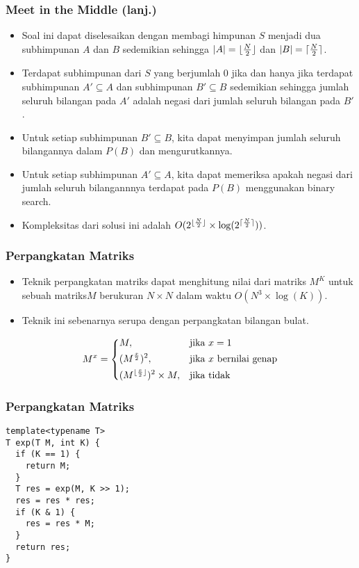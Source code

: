 \begin{frame}
\frametitle{Meet in the Middle (lanj.)}
\begin{itemize}
  \item Soal ini dapat diselesaikan dengan membagi himpunan $S$ menjadi dua subhimpunan $A$ dan $B$ sedemikian sehingga $|A| = \lfloor \frac{N}{2} \rfloor$ dan $|B| = \lceil \frac{N}{2} \rceil$.
  \item Terdapat subhimpunan dari $S$ yang berjumlah $0$ jika dan hanya jika terdapat subhimpunan $A' \subseteq A$ dan subhimpunan $B' \subseteq B$ sedemikian sehingga jumlah seluruh bilangan pada $A'$ adalah negasi dari jumlah seluruh bilangan pada $B'$.
  \item Untuk setiap subhimpunan $B' \subseteq B$, kita dapat menyimpan jumlah seluruh bilangannya dalam \farray $P(B)$ dan mengurutkannya.
  \item Untuk setiap subhimpunan $A' \subseteq A$, kita dapat memeriksa apakah negasi dari jumlah seluruh bilangannnya terdapat pada \farray$P(B)$ menggunakan binary search.
  \item Kompleksitas dari solusi ini adalah $O(2^{\lfloor \frac{N}{2} \rfloor} \times \log(2^{\lceil \frac{N}{2} \rceil}))$.
\end{itemize}
\end{frame}

\begin{frame}
\frametitle{Perpangkatan Matriks}
\begin{itemize}
  \item Teknik perpangkatan matriks dapat menghitung nilai dari matriks $M^K$ untuk sebuah matriks$M$ berukuran $N \times N$ dalam waktu $O(N^3 \times \log(K))$.
  \item Teknik ini sebenarnya serupa dengan perpangkatan bilangan bulat.
\end{itemize}
\[
    M^x= 
\begin{dcases}
    M,                                    & \text{jika } x = 1\\
    (M^{\frac{x}{2}})^2,                  & \text{jika } x \text{ bernilai genap}\\
    (M^{\lfloor \frac{x}{2} \rfloor})^2 \times M, & \text{jika tidak}
\end{dcases}
\]
\end{frame}

\begin{frame}[fragile]
\frametitle{Perpangkatan Matriks}
\begin{lstlisting}
template<typename T>
T exp(T M, int K) {
  if (K == 1) {
    return M;
  }
  T res = exp(M, K >> 1);
  res = res * res;
  if (K & 1) {
    res = res * M;
  }
  return res;
}
\end{lstlisting}
\end{frame}

